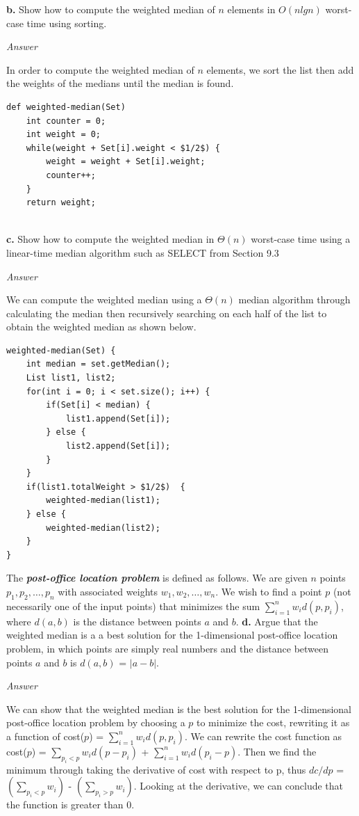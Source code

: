 \documentclass{article}
\begin{document}
\begin{enumerate}
\newpage
\subitem \textbf{b.} Show how to compute the weighted median of $n$ elements in $O(nlgn)$ worst-case time using sorting.

{\textit{Answer}}

In order to compute the weighted median of $n$ elements, we sort the list then add the weights of the medians until the median is found.

\begin{lstlisting}
def weighted-median(Set)
	int counter = 0;
	int weight = 0;
	while(weight + Set[i].weight < $1/2$) {
		weight = weight + Set[i].weight;
		counter++;
	}
	return weight;
	
\end{lstlisting}

\newpage

\subitem \textbf{c.} Show how to compute the weighted median in $\Theta(n)$ worst-case time using a linear-time median algorithm such as SELECT from Section 9.3

{\textit{Answer}}

We can compute the weighted median using a $\Theta(n)$ median algorithm through calculating the median then recursively searching on each half of the list to obtain the weighted median as shown below. 

\begin{lstlisting}
weighted-median(Set) {
	int median = set.getMedian();
	List list1, list2;	
	for(int i = 0; i < set.size(); i++) {
		if(Set[i] < median) {
			list1.append(Set[i]);
		} else {
			list2.append(Set[i]);
		}
	}
	if(list1.totalWeight > $1/2$)  {
		weighted-median(list1);
	} else {
		weighted-median(list2);
	}
}
\end{lstlisting}

\newpage
The \textbf{\textit{post-office location problem}} is defined as follows. We are given $n$ points $p_1, p_2, \dotso, p_n$ with associated weights $w_1, w_2, \dotso, w_n$. We wish to find a point $p$ (not necessarily one of the input points) that minimizes the sum $\sum_{i = 1}^{n} w_i d(p, p_i)$, where $d(a, b)$ is the distance between points $a$ and $b$.
\subitem \textbf{d.} Argue that the weighted median is a a best solution for the 1-dimensional post-office location problem, in which points are simply real numbers and the distance between points $a$ and $b$ is $d(a, b)$ = $|a-b|$.

{\textit{Answer}} 

We can show that the weighted median is the best solution for the 1-dimensional post-office location problem by choosing a $p$ to minimize the cost, rewriting it as a function of cost($p$) = $\sum_{i = 1}^{n} w_i d(p, p_i)$. We can rewrite the cost function as cost($p$) = $\sum_{p_i < p} w_i d( p - p_i)$ + $\sum_{i = 1}^{n} w_i d(p_i - p)$. Then we find the minimum through taking the derivative of cost with respect to p, thus $dc/dp$ = $(\sum_{p_i < p} w_i)$ - $(\sum_{p_i > p} w_i)$. Looking at the derivative, we can conclude that the function is greater than 0. 


\end{enumerate}
\end{document}
